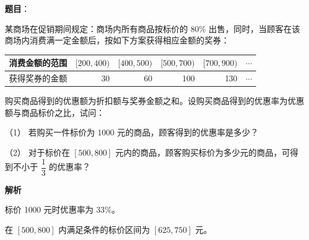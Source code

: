 \begin{answer}

\textbf{题目}：

某商场在促销期间规定：商场内所有商品按标价的 80\% 出售，同时，当顾客在该商场内消费满一定金额后，按如下方案获得相应金额的奖券：

\begin{center}
\begin{tabular}{lrrrrr}
\toprule
消费金额的范围 & $[200,400)$ & $[400,500)$ & $[500,700)$ & $[700,900)$ & $\cdots$ \\
\midrule
获得奖券的金额 & 30 & 60 & 100 & 130 & $\cdots$ \\
\bottomrule
\end{tabular}
\end{center}

购买商品得到的优惠额为折扣额与奖券金额之和。设购买商品得到的优惠率为优惠额与商品标价之比，试问：

（1） 若购买一件标价为 1000 元的商品，顾客得到的优惠率是多少？

（2） 对于标价在 $[500,800]$ 元内的商品，顾客购买标价为多少元的商品，可得到不小于 $\dfrac13$ 的优惠率？

\textbf{解析}


标价 1000 元时优惠率为 $33\%$。


在 $[500,800]$ 内满足条件的标价区间为 $[625,750]$ 元。



\end{answer}
